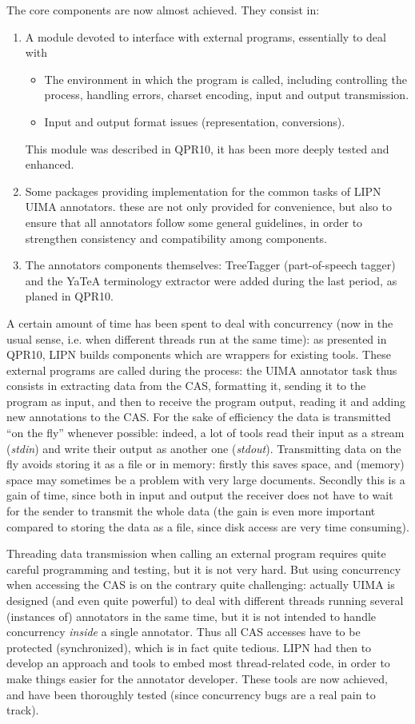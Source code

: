 The core components are now almost achieved. They consist in:
\begin{enumerate}
\item A module devoted to interface with external programs, essentially to deal with 
\begin{itemize}
\item The environment in which the program is called, including controlling the process, handling errors, charset encoding, input and output transmission.
\item Input and output format issues (representation, conversions).
\end{itemize}
This module was described in QPR10, it has been more deeply tested and enhanced.
\item Some packages providing implementation for the common tasks of LIPN UIMA annotators. these are not only provided for convenience, but also to ensure that all annotators follow some general guidelines, in order to strengthen consistency and compatibility among components.
\item The annotators components themselves: TreeTagger (part-of-speech tagger) and the YaTeA terminology extractor were added during the last period, as planed in QPR10.
\end{enumerate}

A certain amount of time has been spent to deal with concurrency (now in the usual sense, i.e. when different threads run at the same time): as presented in QPR10, LIPN builds components which are wrappers for existing tools. These external programs are called during the process: the UIMA annotator task thus consists in extracting data from the CAS, formatting it, sending it to the program as input, and then to receive the program output, reading it and adding new annotations to the CAS. For the sake of efficiency the data is transmitted ``on the fly'' whenever possible: indeed, a lot of tools read their input as a stream ({\em stdin}) and write their output as another one ({\em stdout}). Transmitting data on the fly avoids storing it as a file or in memory: firstly this saves space, and (memory) space may sometimes be a problem with very large documents. Secondly this is a gain of time, since both in input and output the receiver does not have to wait for the sender to transmit the whole data (the gain is even more important compared to storing the data as a file, since disk access are very time consuming).

Threading data transmission when calling an external program requires quite careful programming and testing, but it is not very hard. But using concurrency when accessing the CAS is on the contrary quite challenging: actually UIMA is designed (and even quite powerful) to deal with different threads running several (instances of) annotators in the same time, but it is not intended to handle concurrency {\em inside} a single annotator. Thus all CAS accesses have to be protected (synchronized), which is in fact quite tedious. LIPN had then to develop an approach and tools to embed most thread-related code, in order to make things easier for the annotator developer. These tools are now achieved, and have been thoroughly tested (since concurrency bugs are a real pain to track).

